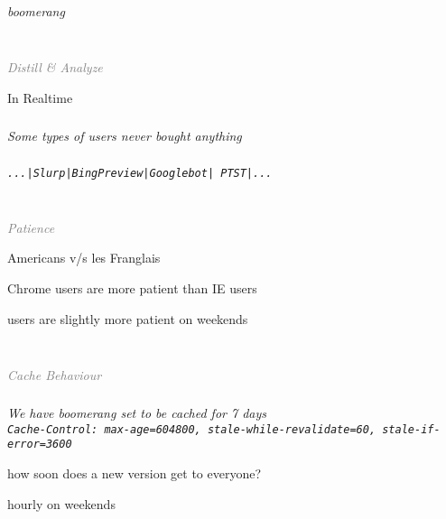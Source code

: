 \documentclass{beamer}
\newcommand{\innersplash}[1]{
  \begin{center}
    \Large \textrm{\textit{ #1 } }
  \end{center}
}
\newcommand{\splashslide}[2][{}]{
  \begin{frame}
  \frametitle{#1}
  \innersplash{#2}
  \end{frame}
}
\newcommand{\leadinslide}[2]{
  \splashslide{
     {\fontsize{150}{20}\selectfont{\raisebox{0pt}[90pt][0pt]{\textcolor{light-gray}{#1}}}} \\ \huge \textcolor{gray}{#2}
  }
}
\begin{document}
\splashslide{boomerang}

\leadinslide{2}{Distill \& Analyze}

\begin{frame}{In Realtime}
\end{frame}

\splashslide{Some types of users never bought anything}

\splashslide{\texttt{...|Slurp|BingPreview|Googlebot| PTST|...}}

\leadinslide{2.1}{Patience}

\begin{frame}{Americans v/s les Franglais}
\end{frame}

\begin{frame}{Chrome users are more patient than IE users}
\end{frame}

\begin{frame}{users are slightly more patient on weekends}
\end{frame}

\leadinslide{2.2}{Cache Behaviour}

\splashslide{We have boomerang set to be cached for 7 days \\ \small \texttt{Cache-Control: max-age=604800, stale-while-revalidate=60, stale-if-error=3600}}

\begin{frame}{how soon does a new version get to everyone?}
\end{frame}

\begin{frame}{hourly on weekends}
\end{frame}
\end{document}
